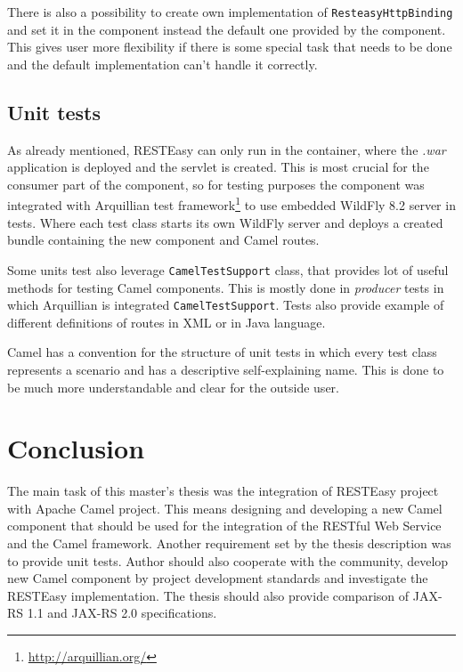 \documentclass[12pt,final,oneside]{fithesis2}
\begin{document}
There is also a possibility to create own implementation of \texttt{Resteasy\-HttpBinding} and set it in the component instead the default one provided by the component. This gives user more flexibility if there is some special task that needs to be done and the default implementation can't handle it correctly.  


\section{Unit tests}
As already mentioned, RESTEasy can only run in the container, where the \textit{.war} application is deployed and the servlet is created. This is most crucial for the consumer part of the component, so for testing purposes the component was integrated with Arquillian test framework\footnote{\url{http://arquillian.org/}} to use embedded WildFly 8.2 server in tests. Where each test class starts its own WildFly server and deploys a created bundle containing the new component and Camel routes.  

Some units test also leverage \texttt{CamelTestSupport} class, that provides lot of useful methods for testing Camel components. This is mostly done in \textit{producer} tests in which Arquillian is integrated \texttt{CamelTestSupport}. Tests also provide example of different definitions of routes in XML or in Java language.

Camel has a convention for the structure of unit tests in which every test class represents a scenario and has a descriptive self-explaining name. This is done to be much more understandable and clear for the outside user. 


\chapter{Conclusion}
The main task of this master's thesis was the integration of RESTEasy project with Apache Camel project. This means designing and developing a new Camel component that should be used for the integration of the RESTful Web Service and the Camel framework. Another requirement set by the thesis description was to provide unit tests. Author should also cooperate with the community, develop new Camel component by project development standards and investigate the RESTEasy implementation. The thesis should also provide comparison of JAX-RS 1.1 and JAX-RS 2.0 specifications.
\end{document}
